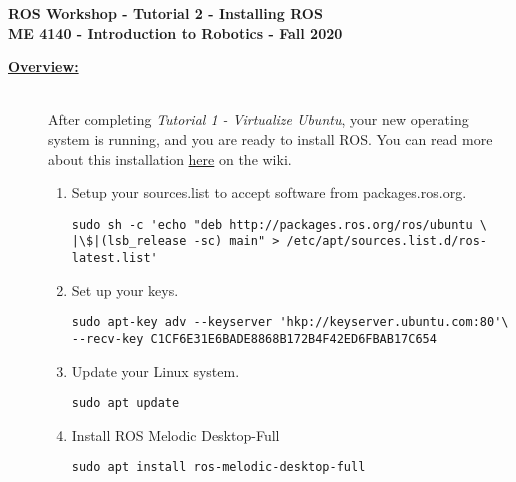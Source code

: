 \documentclass[12pt]{article}
\begin{document}


\begin{center}
   {\bf \Large ROS Workshop - Tutorial 2 - Installing ROS}\vspace{3mm} \\
   {\bf \large ME 4140 - Introduction to Robotics - Fall 2020} \vspace{5mm}\\
\end{center}

\begin{description}

\item[\textbf{\underline{Overview:}}] \hfill \vspace{3mm}\\
After completing {\it Tutorial 1 - Virtualize Ubuntu}, your new operating system is running, and you are ready to install ROS. You can read more about this installation \href{http://wiki.ros.org/melodic/Installation/Ubuntu}{here} on the wiki.

\begin{enumerate}
	
	
	\item  Setup your sources.list to accept software from packages.ros.org.

	\begin{verbatim}
sudo sh -c 'echo "deb http://packages.ros.org/ros/ubuntu \
|\$|(lsb_release -sc) main" > /etc/apt/sources.list.d/ros-latest.list'
	\end{verbatim}
	
	\item Set up your keys. 
	
	\begin{verbatim}
sudo apt-key adv --keyserver 'hkp://keyserver.ubuntu.com:80'\
--recv-key C1CF6E31E6BADE8868B172B4F42ED6FBAB17C654	
	\end{verbatim}
				
	\item Update your Linux system. 
	
	\begin{verbatim}
sudo apt update
	\end{verbatim}
	
	\item Install ROS Melodic Desktop-Full 
	
	\begin{verbatim}
sudo apt install ros-melodic-desktop-full
	\end{verbatim}



\end{enumerate}
\end{description}
\end{document}
